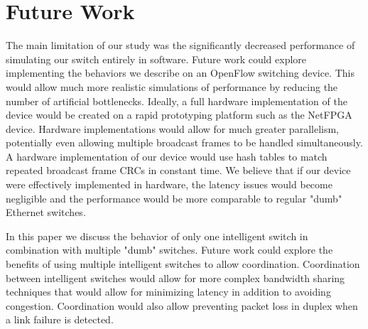 \documentclass{article}
\begin{document}
\section{Future Work}
  The main limitation of our study was the significantly decreased performance of simulating our switch entirely in software.
  Future work could explore implementing the behaviors we describe on an OpenFlow switching device.
  This would allow much more realistic simulations of performance by reducing the number of artificial bottlenecks.
  Ideally, a full hardware implementation of the device would be created on a rapid prototyping platform such as the NetFPGA device.
  Hardware implementations would allow for much greater parallelism, potentially even allowing multiple broadcast frames to be handled simultaneously.
  A hardware implementation of our device would use hash tables to match repeated broadcast frame CRCs in constant time.
  We believe that if our device were effectively implemented in hardware, the latency issues would become negligible and the performance would be more comparable to regular "dumb" Ethernet switches.

  In this paper we discuss the behavior of only one intelligent switch in combination with multiple "dumb" switches.
  Future work could explore the benefits of using multiple intelligent switches to allow coordination.
  Coordination between intelligent switches would allow for more complex bandwidth sharing techniques that would allow for minimizing latency in addition to avoiding congestion.
  Coordination would also allow preventing packet loss in duplex when a link failure is detected.
\end{document}
